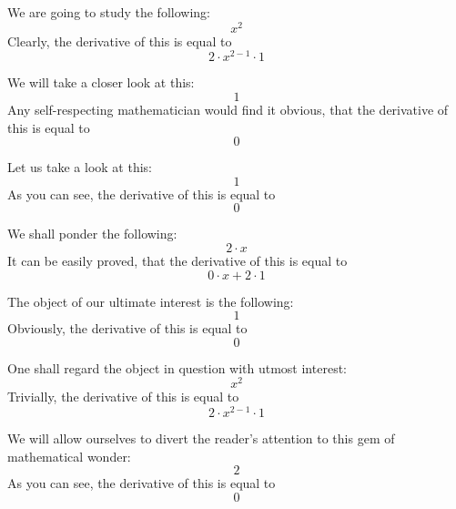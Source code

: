 \documentclass{article}
\begin{document}
We are going to study the following:
\begin{equation}
x ^{2 } 
\end{equation}
Clearly, the derivative of this is equal to
\begin{equation}
2 \cdot x ^{2 - 1 } \cdot 1 
\end{equation}

We will take a closer look at this:
\begin{equation}
1 
\end{equation}
Any self-respecting mathematician would find it obvious, that the derivative of this is equal to
\begin{equation}
0 
\end{equation}

Let us take a look at this:
\begin{equation}
1 
\end{equation}
As you can see, the derivative of this is equal to
\begin{equation}
0 
\end{equation}

We shall ponder the following:
\begin{equation}
2 \cdot x 
\end{equation}
It can be easily proved, that the derivative of this is equal to
\begin{equation}
0 \cdot x + 2 \cdot 1 
\end{equation}

The object of our ultimate interest is the following:
\begin{equation}
1 
\end{equation}
Obviously, the derivative of this is equal to
\begin{equation}
0 
\end{equation}

One shall regard the object in question with utmost interest:
\begin{equation}
x ^{2 } 
\end{equation}
Trivially, the derivative of this is equal to
\begin{equation}
2 \cdot x ^{2 - 1 } \cdot 1 
\end{equation}

We will allow ourselves to divert the reader's attention to this gem of mathematical wonder:
\begin{equation}
2 
\end{equation}
As you can see, the derivative of this is equal to
\begin{equation}
0 
\end{equation}
\end{document}
